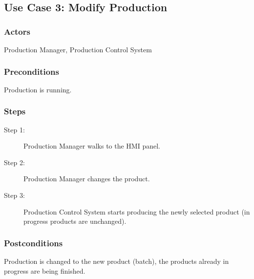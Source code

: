 \subsection{Use Case 3: Modify Production}

\subsubsection{Actors}
Production Manager, Production Control System

\subsubsection{Preconditions}
Production is running.

\subsubsection{Steps}
\begin{description}
    \item[Step 1:] Production Manager walks to the HMI panel.
    \item[Step 2:] Production Manager changes the product.
    \item[Step 3:] Production Control System starts producing the newly selected product (in progress products are unchanged).
\end{description}

\subsubsection{Postconditions}
Production is changed to the new product (batch), the products already in progress are being finished.